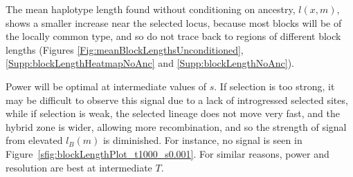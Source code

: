 \documentclass[11pt,letterpaper]{article}
\begin{document}
The mean haplotype length found without conditioning on ancestry, $l(x,m)$,
shows a smaller increase near the selected locus, because most blocks will be of the locally common type, and so do not trace back to regions of different block lengths (Figures \ref{Fig:meanBlockLengthsUnconditioned}, \ref{Supp:blockLengthHeatmapNoAnc} and \ref{Supp:blockLengthNoAnc}).

Power will be optimal at intermediate values of $s$.
If selection is too strong, it may be difficult to observe this signal
due to a lack of introgressed selected sites,
while if selection is weak, the selected lineage does not move very fast,
and the hybrid zone is wider, allowing more recombination,
and so the strength of signal from elevated $l_B(m)$ is diminished.
For instance, no signal is seen in Figure~\ref{sfig:blockLengthPlot_t1000_s0.001}.
For similar reasons, power and resolution are best at intermediate $T$.

\end{document}
